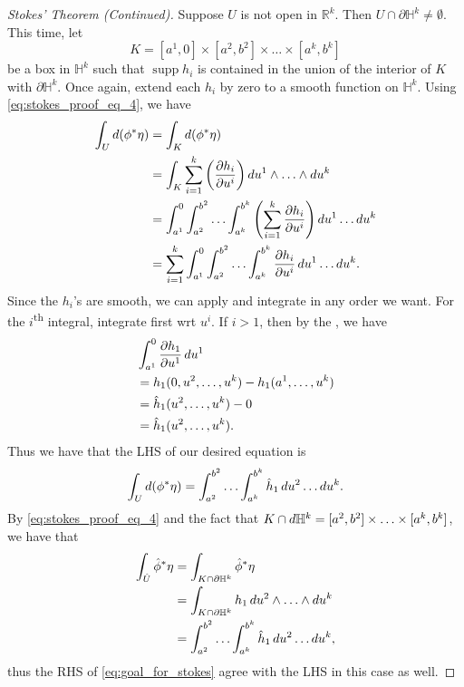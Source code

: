 \documentclass[notoc,notitlepage]{tufte-book}
\DeclareMathOperator{\supp}{supp}
\begin{document}
\begin{proof}[Stokes' Theorem (Continued)]
  \noindent
   Suppose $U$ is not open in $\mathbb{R}^k$. Then $U \cap
  \partial \mathbb{H}^k \neq \emptyset$. This time, let
  \begin{equation*}
    K = [a^1, 0] \times [a^2, b^2] \times \hdots \times [a^k, b^k]
  \end{equation*}
  be a box in $\mathbb{H}^k$ such that $\supp h_i$ is contained in the union of
  the interior of $K$ with $\partial \mathbb{H}^k$. Once again, extend each
  $h_i$ by zero to a smooth function on $\mathbb{H}^k$. Using
  \cref{eq:stokes_proof_eq_4}, we have
  \begin{align*}
    \int_{U} \dif{(\phi^* \eta)}
    &= \int_{K} \dif{(\phi^* \eta)} \\
    &= \int_{K} \sum_{i=1}^{k} \left( \frac{\partial h_i}{\partial u^i} \right)
    \dif{u^1} \land \hdots \land \dif{u^k} \\
    &= \int_{a^1}^{0} \int_{a^2}^{b^2} \hdots \int_{a^k}^{b^k} \left(
    \sum_{i=1}^{k} \frac{\partial h_i}{\partial u^i} \right) \dif{u^1} \hdots
    \dif{u^k} \\
    &= \sum_{i=1}^{k} \int_{a^1}^{0} \int_{a^2}^{b^2} \hdots \int_{a^k}^{b^k}
    \frac{\partial h_i}{\partial u^i} \dif{u^1} \hdots \dif{u^k}.
  \end{align*}
  Since the $h_i$'s are smooth, we can apply  and
  integrate in any order we want. For the $i$\textsuperscript{th} integral,
  integrate first wrt $u^i$. If $i > 1$, then by the , we have
  \begin{align*}
    &\int_{a^1}^{0} \frac{\partial h_1}{\partial u^1} \mathop{}\!d{u^1} \\
    &= h_1(0, u^2, \ldots, u^k) - h_1(a^1, \ldots, u^k) \\
    &= \hat{h}_1(u^2, \ldots, u^k) - 0 \\
    &= \hat{h}_1(u^2, \ldots, u^k).
  \end{align*}
  Thus we have that the LHS of our desired equation is
  \begin{equation*}
    \int_{U} \mathop{}\!d{(\phi^* \eta)} = \int_{a^2}^{b^2} \hdots \int_{a^k}^{b^k}
    \hat{h}_1 \mathop{}\!d{u^2} \hdots \mathop{}\!d{u^k}.
  \end{equation*}
  By \cref{eq:stokes_proof_eq_4} and the fact that $K \cap \mathop{}\!d{\mathbb{H}^k} =
  [a^2, b^2] \times \hdots \times [a^k, b^k]$, we have that
  \begin{align*}
    \int_{\hat{U}} \hat{\phi}^* \eta
    &= \int_{K \cap \partial \mathbb{H}^k} \hat{\phi}^* \eta \\
    &= \int_{K \cap \partial \mathbb{H}^k} h_1 \mathop{}\!d{u^2} \land \hdots \land
    \mathop{}\!d{u^k} \\
    &= \int_{a^2}^{b^2} \hdots \int_{a^k}^{b^k} \hat{h}_1 \mathop{}\!d{u^2} \hdots
    \mathop{}\!d{u^k},
  \end{align*}
  thus the RHS of \cref{eq:goal_for_stokes} agree with the LHS in this case as well.
\end{proof}
\end{document}
